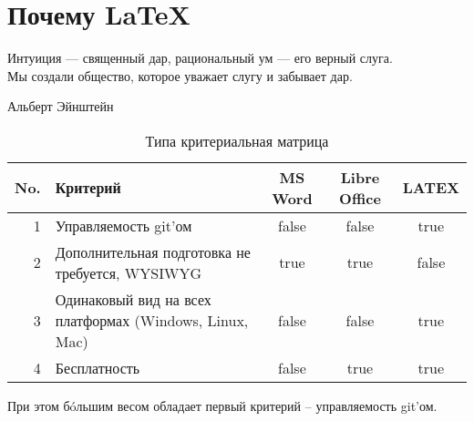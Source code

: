 \section{Почему \LaTeX}

\epigraph{
    Интуиция --- священный дар, рациональный ум --- его верный слуга.\\
    Мы создали общество, которое уважает слугу и забывает дар.}{Альберт Эйнштейн}

\begin{table}[h]
    \caption{Типа критериальная матрица}
    \label{criterion_table}
    \begin{tabular}{|r|p{}|c|c|c|}
        \hline
        \textbf{No.}          &
        \textbf{Критерий}     &
        \textbf{MS Word}      &
        \textbf{Libre Office} &
        \textbf{LATEX}
        \\ \hline
        1 & Управляемость git'ом & false & false & true \\ \hline
        2 & Дополнительная подготовка не требуется, WYSIWYG & true & true & false \\ \hline
        3 & Одинаковый вид на всех платформах (Windows, Linux, Mac) & false & false & true \\ \hline
        4 & Бесплатность & false & true & true \\ \hline
    \end{tabular}
\end{table}

При этом б\'oльшим весом обладает первый критерий -- управляемость git'ом.

\clearpage